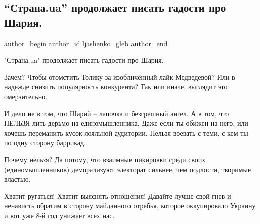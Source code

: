  
 
 
 
 
 
\subsection{\enquote{Страна.ua} продолжает писать гадости про Шария.}
\label{sec:19_08_2021.fb.ljashenko_gleb.1.stranaua_sharij}
 
\ifcmt
 author_begin
   author_id ljashenko_gleb
 author_end
\fi

"Страна.ua" продолжает писать гадости про Шария.

Зачем? Чтобы отомстить Толику за изобличённый лайк Медведевой? Или в надежде
снизить популярность конкурента? Так или иначе, выглядит это омерзительно.

И дело не в том, что Шарий – лапочка и безгрешный ангел. А в том, что НЕЛЬЗЯ
лить дерьмо на единомышленника. Даже если ты обижен на него, или хочешь
переманить кусок лояльной аудитории. Нельзя воевать с теми, с кем ты по одну
сторону баррикад. 

Почему нельзя? Да потому, что взаимные пикировки среди своих (единомышленников)
деморализуют электорат сильнее, чем подлости, творимые властью. 

Хватит ругаться! Хватит выяснять отношения! Давайте лучше свой гнев и ненависть
обратим в сторону майданного отребья, которое оккупировало Украину и вот уже
8-й год унижает всех нас.

